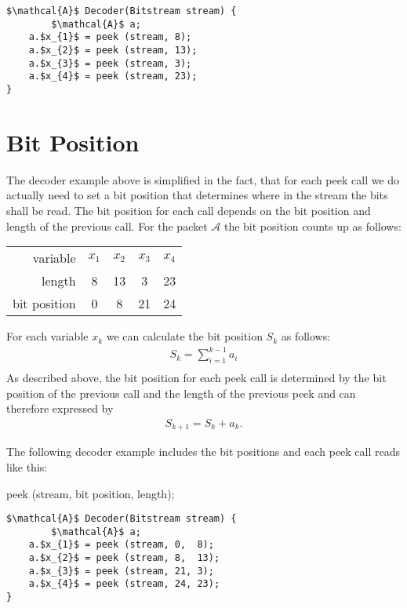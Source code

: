 \documentclass[parskip=half,paper=a4,DIV=13]{scrartcl}
\begin{document}
\begin{lstlisting}[mathescape]
$\mathcal{A}$ Decoder(Bitstream stream) {
        $\mathcal{A}$ a;
	a.$x_{1}$ = peek (stream, 8);
	a.$x_{2}$ = peek (stream, 13);
	a.$x_{3}$ = peek (stream, 3);
	a.$x_{4}$ = peek (stream, 23);
}
\end{lstlisting}

\section{Bit Position}

The decoder example above is simplified in the fact, that for each peek call we do actually
need to set a bit position that determines where in the stream the bits shall be read.
The bit position for each call depends on the bit position and length of the previous call.
For the packet $\mathcal{A}$ the bit position counts up as follows:\\
\begin{center}
\begin{tabular}{r | cccc}
	variable &$x_{1}$ &$x_{2}$ &$x_{3}$ &$x_{4}$\\
	length &8 &13 &3 &23\\
	bit position &0 &8 &21 &24
\end{tabular}
\end{center}
For each variable $x_{k}$ we can calculate the bit position $S_{k}$ as follows:
\begin{align*}
	S_{k} = \sum_{i=1}^{k-1} a_{i}\\
\end{align*}
As described above, the bit position for each peek call is determined by
the bit position of the previous call and the length of the previous peek and can therefore expressed by
\begin{align*}
	S_{k+1} = S_{k} + a_{k}.
\end{align*}

The following decoder example includes the bit positions and each peek call reads like this:
\begin{center}
	peek (stream, bit position, length);
\end{center}

\begin{lstlisting}[mathescape]
$\mathcal{A}$ Decoder(Bitstream stream) {
        $\mathcal{A}$ a;
	a.$x_{1}$ = peek (stream, 0,  8);
	a.$x_{2}$ = peek (stream, 8,  13);
	a.$x_{3}$ = peek (stream, 21, 3);
	a.$x_{4}$ = peek (stream, 24, 23);
}
\end{lstlisting}
\end{document}
